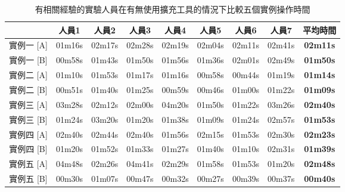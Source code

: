 \begin{table}[H]
    \begin{center}
    \setlength{\abovecaptionskip}{10pt}
    \setlength{\belowcaptionskip}{-10pt}
    
    \caption{有相關經驗的實驗人員在有無使用擴充工具的情況下比較五個實例操作時間}\label{t4.2}
        \begin{tabular}{|c|c|c|c|c|c|c|c|c|}   \hline
        & 人員1   & 人員2   & 人員3   & 人員4   & 人員5   & 人員6   & 人員7    & \textbf{平均時間}\\\hline\hline
        實例一 [A]   & 01m16s    & 02m17s    & 02m28s    & 02m19s    & 02m04s    & 02m11s    & 02m41s    & \textbf{02m11s}\\\hline
        實例一 [B]   & 00m58s    & 01m43s    & 01m50s    & 01m56s    & 01m36s    & 02m01s    & 02m49s    & \textbf{01m50s}\\\hline\hline
        實例二 [A]   & 01m10s    & 01m53s    & 01m17s    & 01m16s    & 00m58s    & 00m44s    & 01m19s    & \textbf{01m14s}\\\hline
        實例二 [B]   & 00m51s    & 01m40s    & 01m25s    & 00m59s    & 00m46s    & 01m00s    & 01m22s    & \textbf{01m09s}\\\hline\hline
        實例三 [A]   & 03m28s    & 02m12s    & 02m00s    & 04m20s    & 01m50s    & 01m22s    & 03m26s    & \textbf{02m40s}\\\hline
        實例三 [B]   & 01m24s    & 03m20s    & 01m20s    & 01m38s    & 01m09s    & 01m24s    & 02m57s    & \textbf{01m53s}\\\hline\hline
        實例四 [A]   & 02m40s    & 02m44s    & 02m40s    & 01m56s    & 02m15s    & 01m53s    & 02m30s    & \textbf{02m23s}\\\hline
        實例四 [B]   & 01m20s    & 01m52s    & 01m33s    & 01m27s    & 01m40s    & 01m10s    & 02m31s    & \textbf{01m39s}\\\hline\hline
        實例五 [A]   & 04m48s    & 02m26s    & 04m41s    & 02m29s    & 01m58s    & 01m53s    & 01m20s    & \textbf{02m48s}\\\hline
        實例五 [B]   & 00m30s    & 01m07s    & 00m47s    & 00m32s    & 00m27s    & 00m39s    & 00m37s    & \textbf{00m40s}\\\hline\hline
        \end{tabular}
    \end{center}
\end{table}

